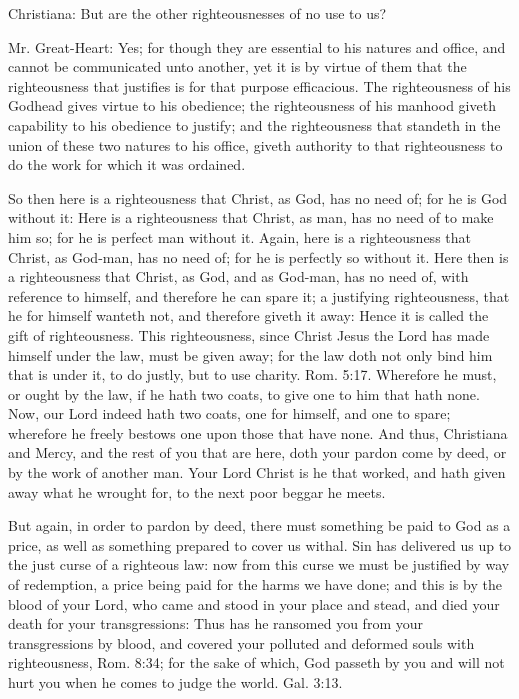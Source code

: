 Christiana: But are the other righteousnesses of no use to us?

Mr. Great-Heart: Yes; for though they are essential to his natures and office, and cannot be communicated unto another, yet it is by virtue of them that the righteousness that justifies is for that purpose efficacious. The righteousness of his Godhead gives virtue to his obedience; the righteousness of his manhood giveth capability to his obedience to justify; and the righteousness that standeth in the union of these two natures to his office, giveth authority to that righteousness to do the work for which it was ordained.

So then here is a righteousness that Christ, as God, has no need of; for he is God without it: Here is a righteousness that Christ, as man, has no need of to make him so; for he is perfect man without it. Again, here is a righteousness that Christ, as God-man, has no need of; for he is perfectly so without it. Here then is a righteousness that Christ, as God, and as God-man, has no need of, with reference to himself, and therefore he can spare it; a justifying righteousness, that he for himself wanteth not, and therefore giveth it away: Hence it is called the gift of righteousness. This righteousness, since Christ Jesus the Lord has made himself under the law, must be given away; for the law doth not only bind him that is under it, to do justly, but to use charity. Rom. 5:17. Wherefore he must, or ought by the law, if he hath two coats, to give one to him that hath none. Now, our Lord indeed hath two coats, one for himself, and one to spare; wherefore he freely bestows one upon those that have none. And thus, Christiana and Mercy, and the rest of you that are here, doth your pardon come by deed, or by the work of another man. Your Lord Christ is he that worked, and hath given away what he wrought for, to the next poor beggar he meets.

But again, in order to pardon by deed, there must something be paid to God as a price, as well as something prepared to cover us withal. Sin has delivered us up to the just curse of a righteous law: now from this curse we must be justified by way of redemption, a price being paid for the harms we have done; and this is by the blood of your Lord, who came and stood in your place and stead, and died your death for your transgressions: Thus has he ransomed you from your transgressions by blood, and covered your polluted and deformed souls with righteousness, Rom. 8:34; for the sake of which, God passeth by you and will not hurt you when he comes to judge the world. Gal. 3:13.

